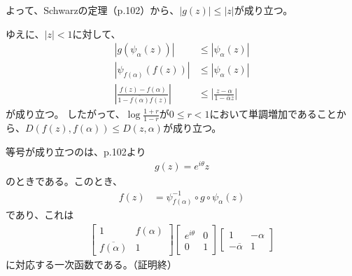 よって、Schwarzの定理（p.102）から、$|g(z)|\le|z|$が成り立つ。

ゆえに、$|z|<1$に対して、
\begin{align*}
    |g(\psi_\alpha(z))|&\le|\psi_\alpha(z)|\\
    |\psi_{f(\alpha)}(f(z))|&\le|\psi_\alpha(z)|\\
    \left|\frac{f(z)-f(\alpha)}{1-\overline{f(\alpha)}f(z)}\right|&\le\left|\frac{z-\alpha}{1-\overline{\alpha}z}\right|
\end{align*}
が成り立つ。
したがって、$\log\frac{1+r}{1-r}$が$0\le r<1$において単調増加であることから、$D(f(z),f(\alpha))\le D(z,\alpha)$が成り立つ。

等号が成り立つのは、p.102より
\begin{align*}
    g(z)=e^{i\theta}z
\end{align*}
のときである。このとき、
\begin{align*}
    f(z)&=\psi_{f(\alpha)}^{-1}\circ g\circ\psi_\alpha(z)
\end{align*}
であり、これは
\begin{align*}
    \begin{bmatrix}
        1&f(\alpha)\\
        \overline{f(\alpha)}&1
    \end{bmatrix}
    \begin{bmatrix}
        e^{i\theta}&0\\
        0&1
    \end{bmatrix}
    \begin{bmatrix}
        1&-\alpha\\
        -\overline{\alpha}&1
    \end{bmatrix}
\end{align*}
に対応する一次函数である。（証明終）